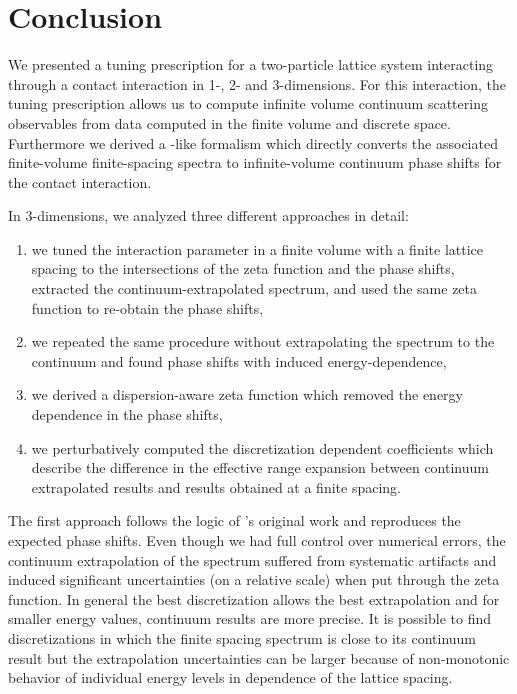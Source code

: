 \section{Conclusion}\label{sec:conclusion}

We presented a tuning prescription for a two-particle lattice system interacting through a contact interaction in 1-, 2- and 3-dimensions.
For this interaction, the tuning prescription allows us to compute infinite volume continuum scattering observables %
from data computed in the finite volume and discrete space.
Furthermore we derived a \Luscher-like formalism which directly converts the associated finite-volume finite-spacing spectra to infinite-volume continuum phase shifts for the contact interaction.

In 3-dimensions, we analyzed three different approaches in detail:
\begin{enumerate}
	\item we tuned the interaction parameter in a finite volume with a finite lattice spacing to the intersections of the \Luscher zeta function and the phase shifts, extracted the continuum-extrapolated spectrum, and used the same \Luscher zeta function to re-obtain the phase shifts,
	\item we repeated the same procedure without extrapolating the spectrum to the continuum and found phase shifts with induced energy-dependence,
	\item we derived a dispersion-aware zeta function which removed the energy dependence in the phase shifts,
	\item we perturbatively computed the discretization dependent coefficients which describe the difference in the effective range expansion between continuum extrapolated results and results obtained at a finite spacing.
\end{enumerate}

The first approach follows the logic of \Luscher's original work and reproduces the expected phase shifts.
Even though we had full control over numerical errors, the continuum extrapolation of the spectrum suffered from systematic artifacts and induced significant uncertainties (on a relative scale) when put through the zeta function.
In general the best discretization allows the best extrapolation and for smaller energy values, continuum results are more precise.
It is possible to find discretizations in which the finite spacing spectrum is close to its continuum result but the extrapolation uncertainties can be larger because of non-monotonic behavior of individual energy levels in dependence of the lattice spacing.

